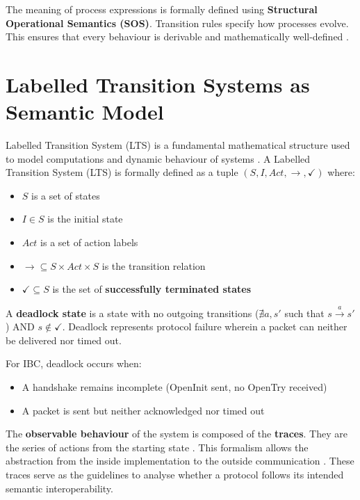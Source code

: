 The meaning of process expressions is formally defined using
\textbf{Structural Operational Semantics (SOS)}. Transition rules
specify how processes evolve. This ensures that every behaviour is
derivable and mathematically well-defined \citep{Vaandrager_1990}.

\section{Labelled Transition Systems as Semantic
Model}\label{labelled-transition-systems-as-semantic-model}

Labelled Transition System (LTS) is a fundamental mathematical structure
used to model computations and dynamic behaviour of systems
\citep{vanBenthemBergstra1995}. A Labelled Transition System (LTS) is
formally defined as a tuple \((S, I, Act, \rightarrow, \checkmark)\)
where:

\begin{itemize}
    \item \(S\) is a set of states
    \item \(I \in S\) is the initial state
    \item \(Act\) is a set of action labels
    \item \(\rightarrow \subseteq S \times Act \times S\) is the transition relation
    \item \(\checkmark \subseteq S\) is the set of \textbf{successfully terminated states}
\end{itemize}

A \textbf{deadlock state} is a state with no outgoing transitions
(\(\nexists a, s'\) such that \(s \xrightarrow{a} s'\)) AND
\(s \notin \checkmark\). Deadlock represents protocol failure wherein a
packet can neither be delivered nor timed out.

For IBC, deadlock occurs when:

\begin{itemize}
    \item A handshake remains incomplete (OpenInit sent, no OpenTry received)
    \item A packet is sent but neither acknowledged nor timed out
\end{itemize}

The \textbf{observable behaviour} of the system is composed of the
\textbf{traces}. They are the series of actions from the starting state
\citep{Gorrieri_2017}. This formalism allows the abstraction from the
inside implementation to the outside communication
\citep{plotkin2004structural}. These traces serve as the guidelines to
analyse whether a protocol follows its intended semantic
interoperability.

